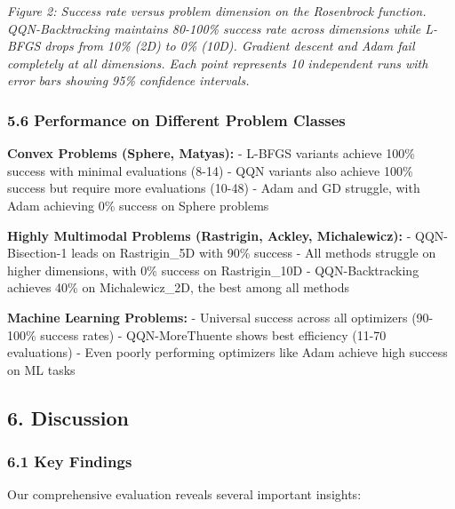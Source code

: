 \emph{Figure 2: Success rate versus problem dimension on the Rosenbrock function. QQN-Backtracking maintains 80-100\% success rate across dimensions while L-BFGS drops from 10\% (2D) to 0\% (10D). Gradient descent and Adam fail completely at all dimensions. Each point represents 10 independent runs with error bars showing 95\% confidence intervals.}

\hypertarget{performance-on-different-problem-classes}{%
\subsubsection{5.6 Performance on Different Problem Classes}\label{performance-on-different-problem-classes}}

\textbf{Convex Problems (Sphere, Matyas):}
- L-BFGS variants achieve 100\% success with minimal evaluations (8-14)
- QQN variants also achieve 100\% success but require more evaluations (10-48)
- Adam and GD struggle, with Adam achieving 0\% success on Sphere problems

\textbf{Highly Multimodal Problems (Rastrigin, Ackley, Michalewicz):}
- QQN-Bisection-1 leads on Rastrigin\_5D with 90\% success
- All methods struggle on higher dimensions, with 0\% success on Rastrigin\_10D
- QQN-Backtracking achieves 40\% on Michalewicz\_2D, the best among all methods

\textbf{Machine Learning Problems:}
- Universal success across all optimizers (90-100\% success rates)
- QQN-MoreThuente shows best efficiency (11-70 evaluations)
- Even poorly performing optimizers like Adam achieve high success on ML tasks

\hypertarget{discussion}{%
\subsection{6. Discussion}\label{discussion}}

\hypertarget{key-findings}{%
\subsubsection{6.1 Key Findings}\label{key-findings}}

Our comprehensive evaluation reveals several important insights:

